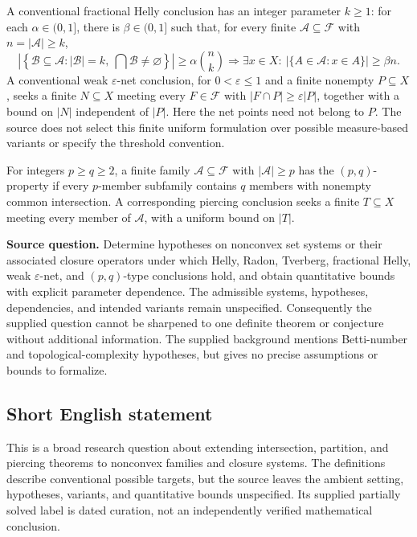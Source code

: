 \documentclass[11pt]{article}
\begin{document}
A conventional fractional Helly conclusion has an integer parameter \(k\geq1\): for each \(\alpha\in(0,1]\), there is \(\beta\in(0,1]\) such that, for every finite \(\mathcal A\subseteq\mathcal F\) with \(n=|\mathcal A|\geq k\),
\[
\left|\left\{\mathcal B\subseteq\mathcal A:|\mathcal B|=k,\ \bigcap\mathcal B\ne\varnothing\right\}\right|
\geq\alpha\binom nk
\Longrightarrow
\exists x\in X:\ \left|\{A\in\mathcal A:x\in A\}\right|\geq\beta n.
\]
A conventional weak \(\varepsilon\)-net conclusion, for \(0<\varepsilon\leq1\) and a finite nonempty \(P\subseteq X\), seeks a finite \(N\subseteq X\) meeting every \(F\in\mathcal F\) with \(|F\cap P|\geq\varepsilon|P|\), together with a bound on \(|N|\) independent of \(|P|\). Here the net points need not belong to \(P\). The source does not select this finite uniform formulation over possible measure-based variants or specify the threshold convention.

For integers \(p\geq q\geq2\), a finite family \(\mathcal A\subseteq\mathcal F\) with \(|\mathcal A|\geq p\) has the \((p,q)\)-property if every \(p\)-member subfamily contains \(q\) members with nonempty common intersection. A corresponding piercing conclusion seeks a finite \(T\subseteq X\) meeting every member of \(\mathcal A\), with a uniform bound on \(|T|\).

\textbf{Source question.} Determine hypotheses on nonconvex set systems or their associated closure operators under which Helly, Radon, Tverberg, fractional Helly, weak \(\varepsilon\)-net, and \((p,q)\)-type conclusions hold, and obtain quantitative bounds with explicit parameter dependence. The admissible systems, hypotheses, dependencies, and intended variants remain unspecified. Consequently the supplied question cannot be sharpened to one definite theorem or conjecture without additional information. The supplied background mentions Betti-number and topological-complexity hypotheses, but gives no precise assumptions or bounds to formalize.
\subsection{Short English statement}
This is a broad research question about extending intersection, partition, and piercing theorems to nonconvex families and closure systems. The definitions describe conventional possible targets, but the source leaves the ambient setting, hypotheses, variants, and quantitative bounds unspecified. Its supplied partially solved label is dated curation, not an independently verified mathematical conclusion.
\end{document}
